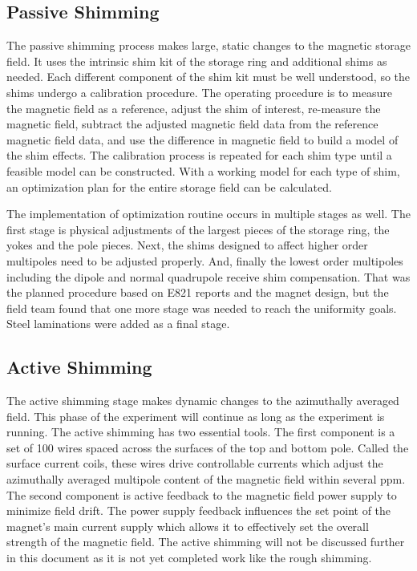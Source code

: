 \subsection{Passive Shimming}
The passive shimming process makes large, static changes to the magnetic storage field.  It uses the intrinsic shim kit of the storage ring and additional shims as needed. Each different component of the shim kit must be well understood, so the shims undergo a calibration procedure.  The operating procedure is to measure the magnetic field as a reference, adjust the shim of interest, re-measure the magnetic field, subtract the adjusted magnetic field data from the reference magnetic field data, and use the difference in magnetic field to build a model of the shim effects.  The calibration process is repeated for each shim type until a feasible model can be constructed.  With a working model for each type of shim, an optimization plan for the entire storage field can be calculated.

The implementation of optimization routine occurs in multiple stages as well.  The first stage is physical adjustments of the largest pieces of the storage ring, the yokes and the pole pieces.  Next, the shims designed to affect higher order multipoles need to be adjusted properly.  And, finally the lowest order multipoles including the dipole and normal quadrupole receive shim compensation.  That was the planned procedure based on E821 reports and the magnet design, but the field team found that one more stage was needed to reach the uniformity goals.  Steel laminations were added as a final stage.

\subsection{Active Shimming}
The active shimming stage makes dynamic changes to the azimuthally averaged field.  This phase of the experiment will continue as long as the experiment is running.  The active shimming has two essential tools.  The first component is a set of 100 wires spaced across the surfaces of the top and bottom pole.  Called the surface current coils, these wires drive controllable currents which adjust the azimuthally averaged multipole content of the magnetic field within several ppm.  The second component is active feedback to the magnetic field power supply to minimize field drift.  The power supply feedback influences the set point of the magnet's main current supply which allows it to effectively set the overall strength of the magnetic field.  The active shimming will not be discussed further in this document as it is not yet completed work like the rough shimming.

